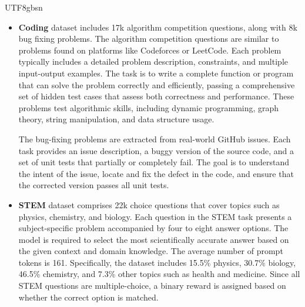 \documentclass[11pt, a4paper, logo, copyright, nonumbering]{deepseek}
\begin{document}
\begin{CJK*}{UTF8}{gbsn}
\begin{itemize}
\item \textbf{Coding} dataset includes 17k algorithm competition questions, along with 8k bug fixing problems. The algorithm competition questions are similar to problems found on platforms like Codeforces or LeetCode. Each problem typically includes a detailed problem description, constraints, and multiple input-output examples. The task is to write a complete function or program that can solve the problem correctly and efficiently, passing a comprehensive set of hidden test cases that assess both correctness and performance. These problems test algorithmic skills, including dynamic programming, graph theory, string manipulation, and data structure usage. 

The bug-fixing problems are extracted from real-world GitHub issues. Each task provides an issue description, a buggy version of the source code, and a set of unit tests that partially or completely fail. The goal is to understand the intent of the issue, locate and fix the defect in the code, and ensure that the corrected version passes all unit tests. 

\item \textbf{STEM} dataset comprises 22k choice questions that cover topics such as physics, chemistry, and biology. Each question in the STEM task presents a subject-specific problem accompanied by four to eight answer options. The model is required to select the most scientifically accurate answer based on the given context and domain knowledge. The average number of prompt tokens is 161. Specifically, the dataset includes 15.5\% physics, 30.7\% biology, 46.5\% chemistry, and 7.3\% other topics such as health and medicine. Since all STEM questions are multiple-choice, a binary reward is assigned based on whether the correct option is matched.


\end{itemize}
\end{CJK*}
\end{document}
